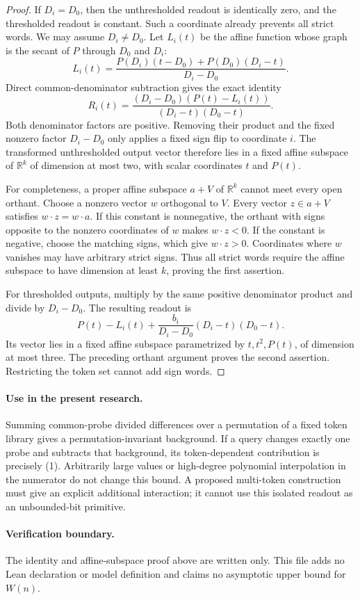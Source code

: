 \documentclass[11pt]{article}
\begin{document}
\begin{proof}
If $D_i=D_0$, then the unthresholded readout is identically zero,
and the thresholded readout is constant. Such a coordinate already
prevents all strict words. We may assume $D_i\ne D_0$.
Let $L_i(t)$ be the affine function whose graph is the secant of $P$
through $D_0$ and $D_i$:
\[
 L_i(t)=\frac{P(D_i)(t-D_0)+P(D_0)(D_i-t)}{D_i-D_0}.
\]
Direct common-denominator subtraction gives the exact identity
\[
 R_i(t)=
 \frac{(D_i-D_0)(P(t)-L_i(t))}{(D_i-t)(D_0-t)}.
 \tag{1}
\]
Both denominator factors are positive. Removing their product and
the fixed nonzero factor $D_i-D_0$ only applies a fixed sign flip to
coordinate $i$. The transformed unthresholded output vector therefore
lies in a fixed affine subspace of $\mathbb R^k$ of dimension at most
two, with scalar coordinates $t$ and $P(t)$.

For completeness, a proper affine subspace $a+V$ of $\mathbb R^k$
cannot meet every open orthant. Choose a nonzero vector $w$ orthogonal
to $V$. Every vector $z\in a+V$ satisfies $w\cdot z=w\cdot a$.
If this constant is nonnegative, the orthant with signs opposite to
the nonzero coordinates of $w$ makes $w\cdot z<0$. If the constant
is negative, choose the matching signs, which give $w\cdot z>0$.
Coordinates where $w$ vanishes may have arbitrary strict signs.
Thus all strict words require the affine subspace to have dimension
at least $k$, proving the first assertion.

For thresholded outputs, multiply by the same positive denominator
product and divide by $D_i-D_0$. The resulting readout is
\[
 P(t)-L_i(t)+\frac{b_i}{D_i-D_0}(D_i-t)(D_0-t).
 \tag{2}
\]
Its vector lies in a fixed affine subspace parametrized by
$t,t^2,P(t)$, of dimension at most three. The preceding orthant
argument proves the second assertion. Restricting the token set
cannot add sign words.
\end{proof}

\paragraph{Use in the present research.}
Summing common-probe divided differences over a permutation of a
fixed token library gives a permutation-invariant background. If a
query changes exactly one probe and subtracts that background, its
token-dependent contribution is precisely (1). Arbitrarily large
values or high-degree polynomial interpolation in the numerator do
not change this bound. A proposed multi-token construction must give
an explicit additional interaction; it cannot use this isolated
readout as an unbounded-bit primitive.

\paragraph{Verification boundary.}
The identity and affine-subspace proof above are written only. This
file adds no Lean declaration or model definition and claims no
asymptotic upper bound for $W(n)$.
\end{document}
